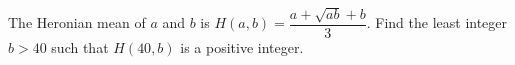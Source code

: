 The Heronian mean of $a$ and $b$ is $H(a,b)=\dfrac{a+\sqrt{ab}+b}3$. Find the least integer $b>40$ such that $H(40,b)$ is a positive integer.
